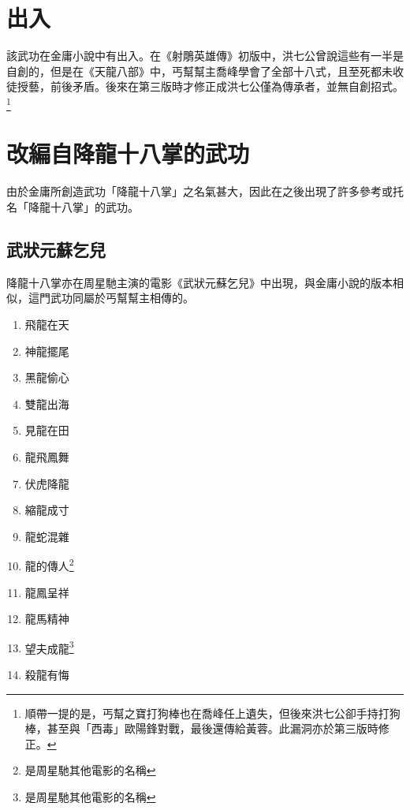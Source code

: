 \section{出入}
該武功在金庸小說中有出入。在《射鵰英雄傳》初版中，洪七公曾說這些有一半是自創的，但是在《天龍八部》中，丐幫幫主喬峰學會了全部十八式，且至死都未收徒授藝，前後矛盾。後來在第三版時才修正成洪七公僅為傳承者，並無自創招式。\footnote{順帶一提的是，丐幫之寶打狗棒也在喬峰任上遺失，但後來洪七公卻手持打狗棒，甚至與「西毒」歐陽鋒對戰，最後還傳給黃蓉。此漏洞亦於第三版時修正。}
\section{改編自降龍十八掌的武功}
由於金庸所創造武功「降龍十八掌」之名氣甚大，因此在之後出現了許多參考或托名「降龍十八掌」的武功。
\subsection{武狀元蘇乞兒}
降龍十八掌亦在周星馳主演的電影《武狀元蘇乞兒》中出現，與金庸小說的版本相似，這門武功同屬於丐幫幫主相傳的。

\begin{multicols}{3}
  \begin{enumerate}
  \item 飛龍在天
  \item 神龍擺尾
  \item 黑龍偷心
  \item 雙龍出海
  \item 見龍在田
  \item 龍飛鳳舞
  \item 伏虎降龍
  \item 縮龍成寸
  \item 龍蛇混雜
  \item 龍的傳人\footnote{是周星馳其他電影的名稱}
  \item 龍鳳呈祥
  \item 龍馬精神
  \item 望夫成龍\footnote{是周星馳其他電影的名稱}
  \item 殺龍有悔
  \end{enumerate}
\end{multicols}
